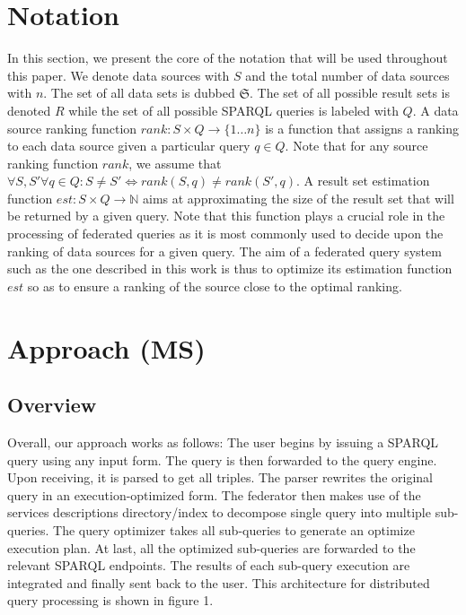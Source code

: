 \documentclass{sig-alternate}  %
\begin{document}
\section{Notation}
In this section, we present the core of the notation that will be used throughout this paper.
We denote data sources with $S$ and the total number of data sources with $n$. 
The set of all data sets is dubbed $\mathfrak{S}$.
The set of all possible result sets is denoted $R$ while the set of all possible SPARQL queries is labeled with $Q$. 
A data source ranking function $rank: S \times Q \rightarrow \{1 \ldots n\}$ is a function that assigns a ranking to each data source given a particular query $q \in Q$.
Note that for any source ranking function $rank$, we assume that $\forall S, S' \forall q \in Q : S  \neq S' \Longleftrightarrow rank(S, q) \neq rank (S', q)$.
A result set estimation function $est: S \times Q \rightarrow \mathbb{N}$ aims at approximating the size of the result set that will be returned by a given query.
Note that this function plays a crucial role in the processing of federated queries as it is most commonly used to decide upon the ranking of data sources for a given query.
The aim of a federated query system such as the one described in this work is thus to optimize its estimation function $est$ so as to ensure a ranking of the source close to the optimal ranking. %
\section{Approach (MS)}
\subsection{Overview}
 Overall, our approach works as follows: The user begins by issuing
a SPARQL query using any input form. The query is then forwarded to
the query engine. Upon receiving, it is parsed to get all triples.
The parser rewrites the original query in an execution-optimized
form. The federator then makes use of the services descriptions directory/index
to decompose single query into multiple sub-queries. The query optimizer
takes all sub-queries to generate an optimize execution plan. At last,
all the optimized sub-queries are forwarded to the relevant SPARQL
endpoints. The results of each sub-query execution are integrated and finally sent
back to the user. This architecture for distributed query processing
is shown in figure 1.
\end{document}
